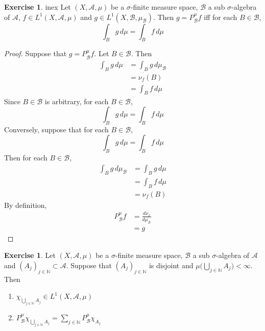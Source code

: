 \documentclass{book}
\theoremstyle{definition}
\newtheorem{ex}[definition]{Exercise}
\newcommand{\sig}{\sigma}
\newcommand{\N}{\mathbb{N}}
\newcommand{\MA}{\mathcal{A}}
\newcommand{\MB}{\mathcal{B}}
\DeclareMathOperator*{\0}{\mbf{0}}
\DeclareMathOperator*{\1}{\mbf{1}}
\newcommand{\dmu}{\, d \mu}
\begin{document}
	\begin{ex}
		in{ex}
		Let $(X, \MA, \mu)$ be a $\sig$-finite measure space, $\MB$ a sub $\sig$-algebra of $\MA$, $f \in L^1(X, \MA, \mu)$ and $g \in L^1(X, \MB, \mu_{\MB})$. Then $g = P^{\mu}_{\MB}f$ iff for each $B \in \MB$, 
		$$\int_B g \dmu = \int_B f \dmu$$
	\end{ex}

	\begin{proof}
		Suppose that $g = P^{\mu}_{\MB}f$. Let $B \in \MB$. Then 
		\begin{align*}
			\int_B g \dmu 
			& = \int_B g \dmu_{\MB} \\
			& = \nu_f(B) \\
			& = \int_B f \dmu 
		\end{align*}
		Since $B \in \MB$ is arbitrary, for each $B \in \MB$, 
		$$\int_B g \dmu = \int_B f \dmu$$ 
		Conversely, suppose that for each $B \in \MB$, 
		$$\int_B g \dmu = \int_B f \dmu$$ 
		Then for each $B \in \MB$,
		\begin{align*}
			\int_B g \dmu_{\MB} 
			& = \int_B g \dmu \\
			& = \int_B f \dmu \\
			& = \nu_f(B) 
		\end{align*} 
		By definition, 
		\begin{align*}
			P^{\mu}_{\MB}f 
			& =  \frac{d \nu_f}{d \mu_{\MB}} \\
			& = g
		\end{align*} 
	\end{proof}
	
	\begin{ex}
		Let $(X, \MA, \mu)$ be a $\sig$-finite measure space, $\MB$ a sub $\sig$-algebra of $\MA$ and $(A_{j})_{j \in \N} \subset \MA$. Suppose that $(A_j)_{j \in \N}$ is disjoint and $\mu \bigg(\bigcup\limits_{j \in \N} A_j \bigg) < \infty$. Then 
		\begin{enumerate}
			\item $\chi_{\bigcup\limits_{j \in \N} A_j} \in L^1(X, \MA, \mu)$
			\item $P^{\mu}_{\MB} \chi_{\bigcup\limits_{j \in \N} A_j} = \sum\limits_{j \in \N} P^{\mu}_{\MB}\chi_{A_j}$
		\end{enumerate}
	\end{ex}
	
\end{document}
